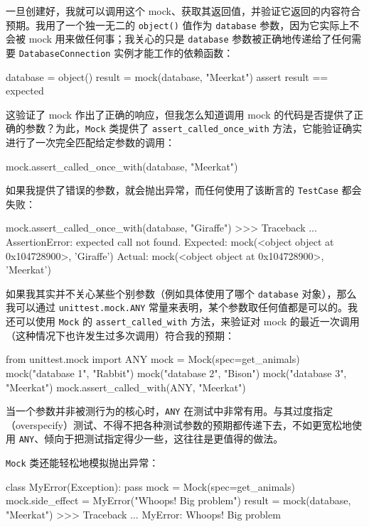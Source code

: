 一旦创建好，我就可以调用这个 mock、获取其返回值，并验证它返回的内容符合预期。我用了一个独一无二的 \texttt{object()} 值作为 \texttt{database} 参数，因为它实际上不会被 mock 用来做任何事；我关心的只是 \texttt{database} 参数被正确地传递给了任何需要 \texttt{DatabaseConnection} 实例才能工作的依赖函数：

\begin{codebox}[python]
database = object()
result = mock(database, "Meerkat")
assert result == expected
\end{codebox}

这验证了 mock 作出了正确的响应，但我怎么知道调用 mock 的代码是否提供了正确的参数？为此，\texttt{Mock} 类提供了 \texttt{assert\_called\_once\_with} 方法，它能验证确实进行了一次完全匹配给定参数的调用：

\begin{codebox}[python]
mock.assert_called_once_with(database, "Meerkat")
\end{codebox}

如果我提供了错误的参数，就会抛出异常，而任何使用了该断言的 \texttt{TestCase} 都会失败：

\begin{codebox}[python]
mock.assert_called_once_with(database, "Giraffe")
>>>
Traceback ...
AssertionError: expected call not found.
Expected: mock(<object object at 0x104728900>, 'Giraffe')
  Actual: mock(<object object at 0x104728900>, 'Meerkat')
\end{codebox}

如果我其实并不关心某些个别参数（例如具体使用了哪个 \texttt{database} 对象），那么我可以通过 \texttt{unittest.mock.ANY} 常量来表明，某个参数取任何值都是可以的。我还可以使用 \texttt{Mock} 的 \texttt{assert\_called\_with} 方法，来验证对 mock 的最近一次调用（这种情况下也许发生过多次调用）符合我的预期：

\begin{codebox}[python]
from unittest.mock import ANY
mock = Mock(spec=get_animals)
mock("database 1", "Rabbit")
mock("database 2", "Bison")
mock("database 3", "Meerkat")
mock.assert_called_with(ANY, "Meerkat")
\end{codebox}

当一个参数并非被测行为的核心时，\texttt{ANY} 在测试中非常有用。与其过度指定（overspecify）测试、不得不把各种测试参数的预期都传递下去，不如更宽松地使用 \texttt{ANY}、倾向于把测试指定得少一些，这往往是更值得的做法。

\texttt{Mock} 类还能轻松地模拟抛出异常：

\begin{codebox}[python]
class MyError(Exception):
    pass
mock = Mock(spec=get_animals)
mock.side_effect = MyError("Whoops! Big problem")
result = mock(database, "Meerkat")
>>>
Traceback ...
MyError: Whoops! Big problem
\end{codebox}

